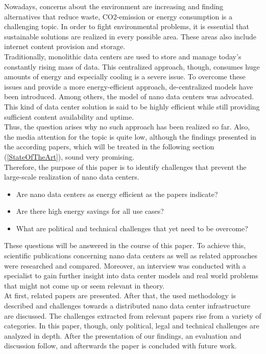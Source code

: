 Nowadays, concerns about the environment are increasing and finding alternatives that reduce waste, CO2-emission or energy consumption is a challenging topic. In order to fight environmental problems, it is essential that sustainable solutions are realized in every possible area. These areas also include internet content provision and storage.\\ Traditionally, monolithic data centers are used to store and manage today's constantly rising mass of data. This centralized approach, though, consumes huge amounts of energy and especially cooling is a severe issue. To overcome these issues and provide a more energy-efficient approach, de-centralized models have been introduced. Among others, the model of nano data centers was advocated. This kind of data center solution is said to be highly efficient while still providing sufficient content availability and uptime.\\ 
Thus, the question arises why no such approach has been realized so far. Also, the media attention for the topic is quite low, although the findings presented in the according papers, which will be treated in the following section (\autoref{StateOfTheArt}), sound very promising. \\
Therefore, the purpose of this paper is to identify challenges that prevent the large-scale realization of nano data centers. 
\begin{itemize}
\item Are nano data centers as energy efficient as the papers indicate? 
\item Are there high energy savings for all use cases? 
\item What are political and technical challenges that yet need to be overcome? 
\end{itemize}
These questions will be answered in the course of this paper. To achieve this, scientific publications concerning nano data centers as well as related approaches were researched and compared. Moreover, an interview was conducted with a specialist to gain further insight into data center models and real world problems that might not come up or seem relevant in theory.\\
At first, related papers are presented. After that, the used methodology is described and challenges towards a distributed nano data center infrastructure are discussed. The challenges extracted from relevant papers rise from a variety of categories. In this paper, though, only political, legal and technical challenges are analyzed in depth. After the presentation of our findings, an evaluation and discussion follow, and afterwards the paper is concluded with future work. 

